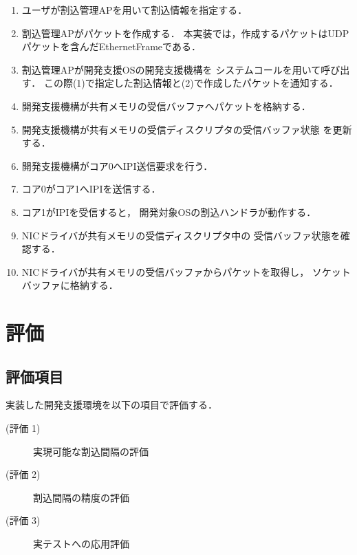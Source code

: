 \documentclass[submit,techreq,noauthor,dvipdfmx]{ipsj}
\begin{document}
\begin{enumerate}
    \item
        ユーザが割込管理APを用いて割込情報を指定する．
    \item 
        割込管理APがパケットを作成する．
        本実装では，作成するパケットはUDPパケットを含んだEthernetFrameである．
    \item 
        割込管理APが開発支援OSの開発支援機構を
        システムコールを用いて呼び出す．
        この際(1)で指定した割込情報と(2)で作成したパケットを通知する．
    \item 
        開発支援機構が共有メモリの受信バッファへパケットを格納する．
    \item 
        開発支援機構が共有メモリの受信ディスクリプタの受信バッファ状態
        を更新する．
    \item
        開発支援機構がコア0へIPI送信要求を行う．
    \item
        コア0がコア1へIPIを送信する．
    \item 
        コア1がIPIを受信すると，
        開発対象OSの割込ハンドラが動作する．
    \item 
        NICドライバが共有メモリの受信ディスクリプタ中の
        受信バッファ状態を確認する．
    \item 
        NICドライバが共有メモリの受信バッファからパケットを取得し，
        ソケットバッファに格納する．
\end{enumerate}

\section{評価}\label{chap:evaluation}

\subsection{評価項目}\label{sec:item-of-evaluation}

実装した開発支援環境を以下の項目で評価する．
\begin{description}
    \item[(評価 1)]実現可能な割込間隔の評価
    \item[(評価 2)]割込間隔の精度の評価
    \item[(評価 3)]実テストへの応用評価
\end{description}
\end{document}
